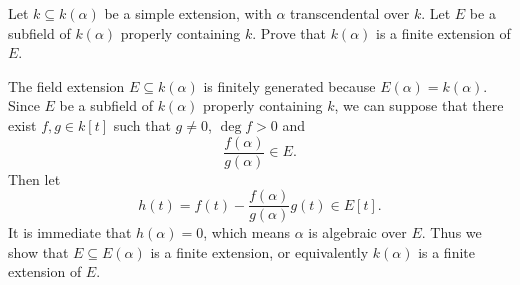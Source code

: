 \documentclass[12pt,letterpaper,boxed]{hmcpset}
\begin{document}
\begin{problem}[1.4]
Let $k \subseteq k(\alpha)$ be a simple extension, with $\alpha$ transcendental over $k$. Let $E$ be a subfield of $k(\alpha)$ properly containing $k$. Prove that $k(\alpha)$ is a finite extension of $E$.
\end{problem}
\begin{solution}
The field extension $E\subseteq k(\alpha)$ is finitely generated because  $E(\alpha)= k(\alpha)$. Since $E$ be a subfield of $k(\alpha)$ properly containing $k$, we can suppose that there exist $f,g\in k[t]$ such that $g\ne0$, $\deg f>0$ and
\[
\frac{f(\alpha)}{g(\alpha)}\in E.
\]
Then let
\[
h(t)=f(t)-\frac{f(\alpha)}{g(\alpha)}g(t)\in E[t].
\]
It is immediate that $h(\alpha)=0$, which means $\alpha$ is algebraic over $E$. Thus we show that $E\subseteq E(\alpha)$ is a finite extension, or equivalently $k(\alpha)$ is a finite extension of $E$.
\end{solution}
\end{document}
